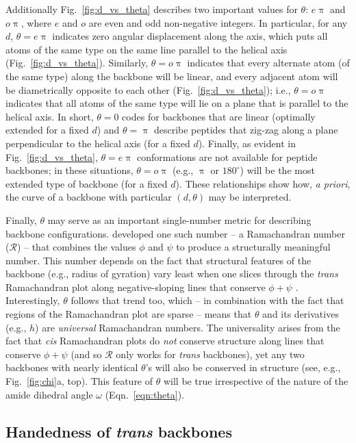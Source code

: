 \documentclass[fleqn,10pt,lineno]{wlpeerj} %
\newcommand{\n}[1]{{\color{black}#1}} %
\newcommand{\Fig}[1]{Fig.~\ref{#1}}
\newcommand{\Eqn}[1]{Eqn.~\ref{#1}}
\newcommand{\h}{h}
\newcommand{\cis}{{\em cis}\xspace}
\newcommand{\trans}{{\em trans}\xspace}
\begin{document}
{Additionally \Fig{fig:d_vs_theta} describes two important values for $\theta$: $e\uppi$ and $o\uppi$, where $e$ and $o$ are even and odd non-negative integers. In particular, for any $d$, $\theta=e\uppi$ indicates zero angular displacement along the axis, which puts all atoms of the same type on the same line parallel to the helical axis (\Fig{fig:d_vs_theta}). Similarly, $\theta=o\uppi$ indicates that every alternate atom (of the same type) along the backbone will be linear, and every adjacent atom will be diametrically opposite to each other (\Fig{fig:d_vs_theta}); i.e., $\theta=o\uppi$ indicates that all atoms of the same type will lie on a plane that is parallel to the helical axis. In short, $\theta=0$ codes for backbones that are linear (optimally extended for a fixed $d$) and $\theta=\uppi$ describe peptides that zig-zag along a plane perpendicular to the helical axis (for a fixed $d$). Finally, as evident in \Fig{fig:d_vs_theta}, $\theta=e\uppi$ conformations are not available for peptide backbones; in these situations, $\theta=o\uppi$ (e.g., $\uppi$ or $180^\circ$) will be the most extended type of backbone (for a fixed $d$). These relationships show how, {\em a priori}, the curve of a backbone with particular $(d,\theta)$ may be interpreted. 

Finally, $\theta$ may serve as an important single-number metric for describing backbone configurations. \cite{Mannige2016} developed one such number -- a Ramachandran number ($\mathcal{R}$) -- that combines the values $\phi$ and $\psi$ to produce a structurally meaningful number. This number depends on the fact that structural features of the backbone (e.g., radius of gyration) vary least when one slices through the \trans Ramachandran plot along negative-sloping lines that conserve $\phi+\psi$ \citep{Ho2003,Zacharias2013,Mannige2016}. Interestingly, $\theta$ follows that trend too, which -- in combination with the fact that regions of the Ramachandran plot are sparse \citep{Mannige2016} -- means that $\theta$ and its derivatives (e.g., $\h$) are {\it universal} Ramachandran numbers. The universality arises from the fact that \cis Ramachandran plots do {\it not} conserve structure along lines that conserve $\phi+\psi$ (and so $\mathcal{R}$ only works for \trans backbones), yet any two backbones with nearly identical $\theta$'s will also be conserved in structure (see, e.g., \Fig{fig:chi}a, top). This feature of $\theta$ will be true irrespective of the nature of the amide dihedral angle $\omega$ (\Eqn{eqn:theta}).
}

\subsection*{Handedness \n{of} \textit{trans} backbones}
\end{document}
